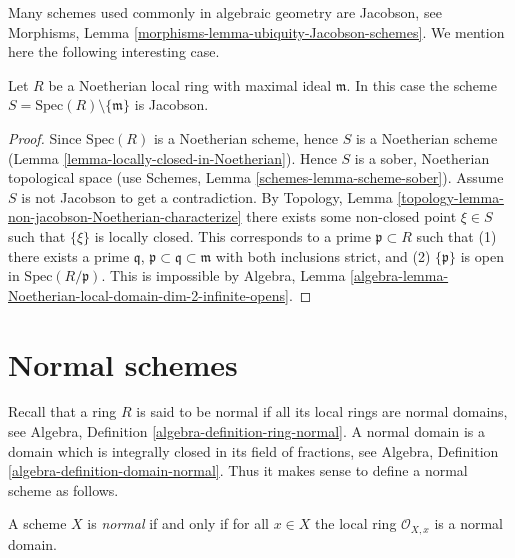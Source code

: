 \noindent
Many schemes used commonly in algebraic geometry are Jacobson, see
Morphisms, Lemma \ref{morphisms-lemma-ubiquity-Jacobson-schemes}.
We mention here the following interesting case.

\begin{lemma}
\label{lemma-complement-closed-point-Jacobson}
Let $R$ be a Noetherian local ring with maximal ideal $\mathfrak m$.
In this case the scheme $S = \text{Spec}(R) \setminus \{\mathfrak m\}$
is Jacobson.
\end{lemma}

\begin{proof}
Since $\text{Spec}(R)$ is a Noetherian scheme, hence
$S$ is a Noetherian scheme (Lemma \ref{lemma-locally-closed-in-Noetherian}).
Hence $S$ is a sober, Noetherian topological space (use
Schemes, Lemma \ref{schemes-lemma-scheme-sober}).
Assume $S$ is not Jacobson to
get a contradiction. By
Topology, Lemma \ref{topology-lemma-non-jacobson-Noetherian-characterize}
there exists some non-closed point $\xi \in S$
such that $\{\xi\}$ is locally closed. This corresponds
to a prime $\mathfrak p \subset R$ such that (1) there exists
a prime $\mathfrak q$, $\mathfrak p \subset \mathfrak q \subset \mathfrak m$
with both inclusions strict, and (2) $\{\mathfrak p\}$ is open in
$\text{Spec}(R/\mathfrak p)$. This is impossible by Algebra,
Lemma \ref{algebra-lemma-Noetherian-local-domain-dim-2-infinite-opens}.
\end{proof}







\section{Normal schemes}
\label{section-normal}

\noindent
Recall that a ring $R$ is said to be normal if all its local rings
are normal domains,
see Algebra, Definition \ref{algebra-definition-ring-normal}.
A normal domain is a domain which is integrally closed in its field
of fractions, see
Algebra, Definition \ref{algebra-definition-domain-normal}.
Thus it makes sense to define a normal scheme as follows.

\begin{definition}
\label{definition-normal}
A scheme $X$ is {\it normal} if and only if for all $x \in X$ the local ring
$\mathcal{O}_{X, x}$ is a normal domain.
\end{definition}

